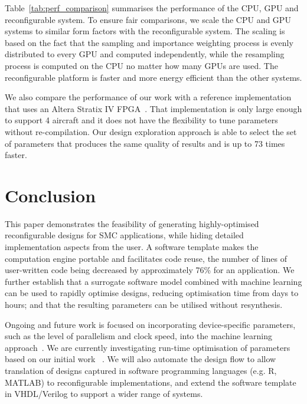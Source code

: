 Table~\ref{tab:perf_comparison} summarises the performance of the CPU, GPU and reconfigurable system.
To ensure fair comparisons, we scale the CPU and GPU systems to similar form factors with the reconfigurable system.
The scaling is based on the fact that the sampling and importance weighting process is evenly distributed to every GPU and computed independently,
while the resampling process is computed on the CPU no matter how many GPUs are used.
The reconfigurable platform is faster and more energy efficient than the other systems.

We also compare the performance of our work with a reference implementation that uses an Altera Stratix IV FPGA~\cite{chau13b}.
That implementation is only large enough to support 4 aircraft and it does not have the flexibility to tune parameters without re-compilation.
Our design exploration approach is able to select the set of parameters that produces the same quality of results and is up to 73 times faster.



\section{Conclusion}
\label{sec:conclusion}

This paper demonstrates the feasibility of generating highly-optimised reconfigurable designs for SMC applications, while hiding detailed implementation aspects from the user.  
A software template makes the computation engine portable and facilitates code reuse, the number of lines of user-written code being decreased by approximately 76\% for an application.
We further establish that a surrogate software model combined with machine learning can be used to rapidly optimise designs, reducing optimisation time from days to hours; 
and that the resulting parameters can be utilised without resynthesis. 

Ongoing and future work is focused on incorporating device-specific parameters, such as the level of parallelism and clock speed, into the machine learning approach~\cite{kurek13b}.
We are currently investigating run-time optimisation of parameters based on our initial work ~\cite{chau13a}.
We will also automate the design flow to allow translation of designs captured in software programming languages (e.g. R, MATLAB) to reconfigurable implementations,
and extend the software template in VHDL/Verilog to support a wider range of systems.

